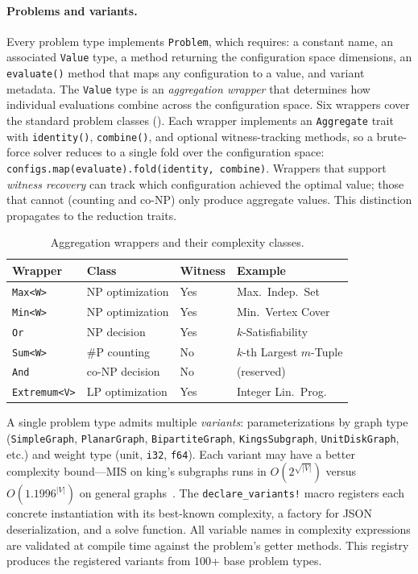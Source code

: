 \documentclass[conference]{IEEEtran}
\begin{document}
\paragraph{Problems and variants.}
Every problem type implements \texttt{Problem}, which requires: a constant name, an associated \texttt{Value} type, a method returning the configuration space dimensions, an \texttt{evaluate()} method that maps any configuration to a value, and variant metadata.
The \texttt{Value} type is an \emph{aggregation wrapper} that determines how individual evaluations combine across the configuration space.
Six wrappers cover the standard problem classes ().
Each wrapper implements an \texttt{Aggregate} trait with \texttt{identity()}, \texttt{combine()}, and optional witness-tracking methods, so a brute-force solver reduces to a single fold over the configuration space: \texttt{configs.map(evaluate).fold(identity, combine)}.
Wrappers that support \emph{witness recovery} can track which configuration achieved the optimal value; those that cannot (counting and co-NP) only produce aggregate values.
This distinction propagates to the reduction traits.

\begin{table}[h]
\caption{Aggregation wrappers and their complexity classes.}\label{tab:wrappers}
\centering
\small
\begin{tabular}{@{}llll@{}}
\toprule
Wrapper & Class & Witness & Example \\
\midrule
\texttt{Max<W>} & NP optimization & Yes & Max.\ Indep.\ Set \\
\texttt{Min<W>} & NP optimization & Yes & Min.\ Vertex Cover \\
\texttt{Or}     & NP decision     & Yes & $k$-Satisfiability \\
\texttt{Sum<W>} & \#P counting    & No  & $k$-th Largest $m$-Tuple \\
\texttt{And}    & co-NP decision  & No  & (reserved) \\
\texttt{Extremum<V>} & LP optimization & Yes & Integer Lin.\ Prog. \\
\bottomrule
\end{tabular}
\end{table}
A single problem type admits multiple \emph{variants}: parameterizations by graph type (\texttt{SimpleGraph}, \texttt{PlanarGraph}, \texttt{BipartiteGraph}, \texttt{KingsSubgraph}, \texttt{UnitDiskGraph}, etc.) and weight type (unit, \texttt{i32}, \texttt{f64}).
Each variant may have a better complexity bound---MIS on king's subgraphs runs in $O(2^{\sqrt{|V|}})$ versus $O(1.1996^{|V|})$ on general graphs~\cite{Xiao2017MIS}.
The \texttt{declare\_variants!} macro registers each concrete instantiation with its best-known complexity, a factory for JSON deserialization, and a solve function.
All variable names in complexity expressions are validated at compile time against the problem's getter methods.
This registry produces the registered variants from 100+ base problem types.
\end{document}
